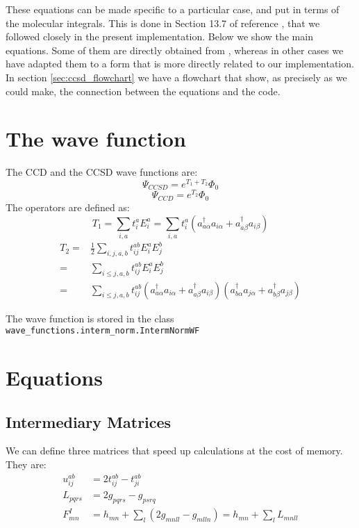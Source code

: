 These equations can be made specific to a particular case,
and put in terms of the molecular integrals.
This is done in Section 13.7 of reference \cite{}, that we followed closely in the present
implementation.
Below we show the main equations.
Some of them are directly obtained from \cite{},
whereas in other cases we have adapted them to a form that is more directly related to our implementation.
In section \ref{sec:ccsd_flowchart} we have a flowchart that show,
as precisely as we could make,
the connection between the equations and the code.

\section{The wave function}

The CCD and the CCSD wave functions are:
\begin{equation}
  \Psi_{CCSD} = e^{T_1 + T_2}\Phi_0
\end{equation}
\begin{equation}
  \Psi_{CCD} = e^{T_2}\Phi_0
\end{equation}
The operators are defined as:
\begin{equation}
  T_1 = \sum_{i,a} t_i^a E_i^a = \sum_{i,a} t_i^a (a_{a\alpha}^\dagger a_{i\alpha} + a_{a\beta}^\dagger a_{i\beta})
\end{equation}
\begin{equation}
  \begin{split}
    T_2 =& \frac{1}{2}\sum_{i,j,a,b} t_{ij}^{ab} E_i^aE_j^b\\
    =& \sum_{i \le j,a,b} t_{ij}^{ab} E_i^aE_j^b\\
    =& \sum_{i \le j,a,b} t_{ij}^{ab} (a_{a\alpha}^\dagger a_{i\alpha} + a_{a\beta}^\dagger a_{i\beta})
    (a_{b\alpha}^\dagger a_{j\alpha} + a_{b\beta}^\dagger a_{j\beta})
  \end{split}
\end{equation}

The wave function is stored in the class \texttt{wave\_functions.interm\_norm.IntermNormWF}


\section{Equations}

\subsection{Intermediary Matrices}
\hypertarget{sec:ccsd_inter_matrix}{}
\label{sec:ccsd_inter_matix}
We can define three matrices that speed up calculations at the cost of memory.
They are:
\begin{equation}
  \begin{split}
    u_{ij}^{ab}&=2t_{ij}^{ab}-t_{ji}^{ab}\\
    L_{pqrs}&=2g_{pqrs}-g_{psrq}\\
    F_{mn}^I&=h_{mn}+\sum_l(2g_{mnll}-g_{mlln})=h_{mn}+\sum_lL_{mnll}
  \end{split}
\end{equation}


